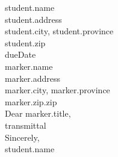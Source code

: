 \documentclass[12pt]{letter}
\begin{document}
{{student.name}} \\
{{student.address}} \\
{{student.city}}, {{student.province}} \\
{{student.zip}} \\
\newline
{{dueDate}} \\
\newline
{{marker.name}} \\
{{marker.address}} \\
{{marker.city}}, {{marker.province}} \\
{{marker.zip.zip}} \\
\newline
Dear {{marker.title}}, \\
\newline
{{transmittal}} \\
\newline
Sincerely, \\
\newline
{{student.name}}










\end{document}
